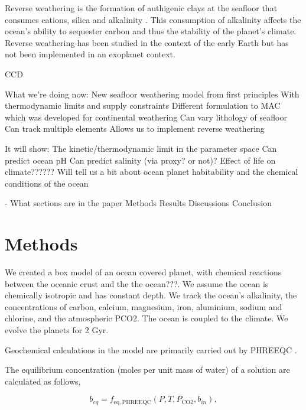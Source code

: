 \documentclass[fleqn,usenatbib]{mnras}
\begin{document}
Reverse weathering is the formation of authigenic clays at the seafloor that consumes cations, silica and alkalinity \cite{isson_reverse_2018}. This consumption of alkalinity affects the ocean's ability to sequester carbon and thus the stability of the planet's climate. Reverse weathering has been studied in the context of the early Earth \citep{isson_reverse_2018, coogan_model_2026} but has not been implemented in an exoplanet context.

CCD
\cite{hakim_diverse_2023}

What we're doing now:
New seafloor weathering model from first principles
With thermodynamic limits and supply constraints
Different formulation to MAC which was developed for continental weathering
Can vary lithology of seafloor
Can track multiple elements
Allows us to implement reverse weathering

It will show:
The kinetic/thermodynamic limit in the parameter space
Can predict ocean pH
Can predict salinity (via proxy? or not)?
Effect of life on climate??????
Will tell us a bit about ocean planet habitability and the chemical conditions of the ocean

- What sections are in the paper
Methods
Results
Discussions
Conclusion

\section{Methods}
We created a box model of an ocean covered planet, with chemical reactions between the oceanic crust and the the ocean???. We assume the ocean is chemically isotropic and has constant depth. We track the ocean's alkalinity, the concentrations of carbon, calcium, magnesium, iron, aluminium, sodium and chlorine, and the atmospheric PCO2. The ocean is coupled to the climate. We evolve the planets for 2 Gyr.



Geochemical calculations in the model are primarily carried out by PHREEQC \cite{pparkhurst_description_2013}. 

The equilibrium concentration (moles per unit mass of water) of a solution are calculated as follows,

\begin{equation}
     b_{eq} = f_{\mathrm{eq,PHREEQC}}(P, T, P_{\mathrm{CO2}}, b_{in}),
\end{equation}
\end{document}
